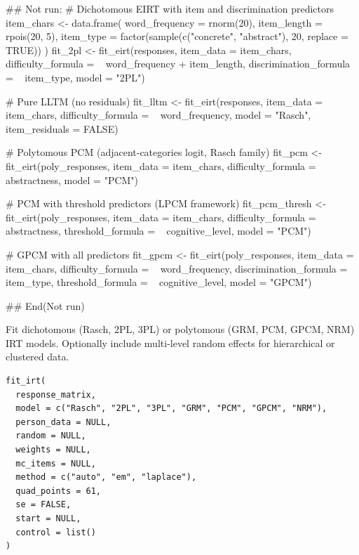 \documentclass[a4paper]{book}
\begin{document}
\begin{Examples}
\begin{ExampleCode}
## Not run: 
# Dichotomous EIRT with item and discrimination predictors
item_chars <- data.frame(
  word_frequency = rnorm(20),
  item_length = rpois(20, 5),
  item_type = factor(sample(c("concrete", "abstract"), 20, replace = TRUE))
)
fit_2pl <- fit_eirt(responses, item_data = item_chars,
                    difficulty_formula = ~ word_frequency + item_length,
                    discrimination_formula = ~ item_type,
                    model = "2PL")

# Pure LLTM (no residuals)
fit_lltm <- fit_eirt(responses, item_data = item_chars,
                     difficulty_formula = ~ word_frequency,
                     model = "Rasch",
                     item_residuals = FALSE)

# Polytomous PCM (adjacent-categories logit, Rasch family)
fit_pcm <- fit_eirt(poly_responses, item_data = item_chars,
                    difficulty_formula = ~ abstractness,
                    model = "PCM")

# PCM with threshold predictors (LPCM framework)
fit_pcm_thresh <- fit_eirt(poly_responses, item_data = item_chars,
                           difficulty_formula = ~ abstractness,
                           threshold_formula = ~ cognitive_level,
                           model = "PCM")

# GPCM with all predictors
fit_gpcm <- fit_eirt(poly_responses, item_data = item_chars,
                     difficulty_formula = ~ word_frequency,
                     discrimination_formula = ~ item_type,
                     threshold_formula = ~ cognitive_level,
                     model = "GPCM")

## End(Not run)

\end{ExampleCode}
\end{Examples}
%
\begin{Description}
Fit dichotomous (Rasch, 2PL, 3PL) or polytomous (GRM, PCM, GPCM, NRM) IRT models.
Optionally include multi-level random effects for hierarchical or clustered data.
\end{Description}
%
\begin{Usage}
\begin{verbatim}
fit_irt(
  response_matrix,
  model = c("Rasch", "2PL", "3PL", "GRM", "PCM", "GPCM", "NRM"),
  person_data = NULL,
  random = NULL,
  weights = NULL,
  mc_items = NULL,
  method = c("auto", "em", "laplace"),
  quad_points = 61,
  se = FALSE,
  start = NULL,
  control = list()
)
\end{verbatim}
\end{Usage}
\end{document}
